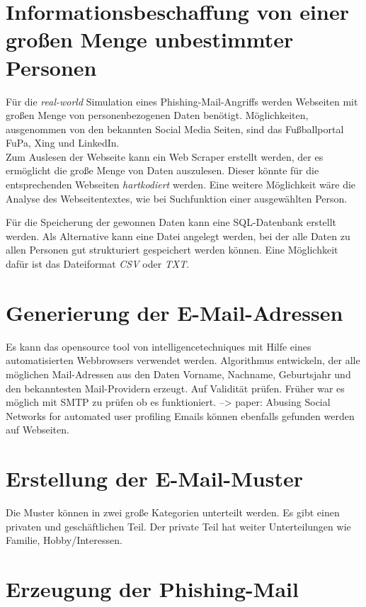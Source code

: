 \section{Informationsbeschaffung von einer großen Menge unbestimmter Personen}
Für die \textit{real-world} Simulation eines Phishing-Mail-Angriffs werden Webseiten mit großen Menge von personenbezogenen Daten benötigt. Möglichkeiten, ausgenommen von den bekannten Social Media Seiten, sind das Fußballportal FuPa, Xing und LinkedIn.\\
Zum Auslesen der Webseite kann ein Web Scraper erstellt werden, der es ermöglicht die große Menge von Daten auszulesen. Dieser könnte für die entsprechenden Webseiten \textit{hartkodiert} werden. Eine weitere Möglichkeit wäre die Analyse des Webseitentextes, wie bei Suchfunktion einer ausgewählten Person.

Für die Speicherung der gewonnen Daten kann eine SQL-Datenbank erstellt werden.
Als Alternative kann eine Datei angelegt werden, bei der alle Daten zu allen Personen gut strukturiert gespeichert werden können. Eine Möglichkeit dafür ist das Dateiformat \textit{CSV} oder \textit{TXT}.%


\section{Generierung der E-Mail-Adressen}
Es kann das opensource tool von intelligencetechniques mit Hilfe eines automatisierten Webbrowsers verwendet werden. Algorithmus entwickeln, der alle möglichen Mail-Adressen aus den Daten Vorname, Nachname, Geburtsjahr und den bekanntesten Mail-Providern erzeugt.
Auf Validität prüfen. Früher war es möglich mit SMTP zu prüfen ob es funktioniert. --> paper: Abusing Social Networks for automated user profiling
Emails können ebenfalls gefunden werden auf Webseiten.
\section{Erstellung der E-Mail-Muster}
Die Muster können in zwei große Kategorien unterteilt werden. Es gibt einen privaten und geschäftlichen Teil. Der private Teil hat weiter Unterteilungen wie Familie, Hobby/Interessen.
\section{Erzeugung der Phishing-Mail}
